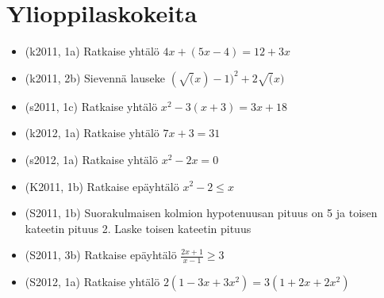 \chapter{Ylioppilaskokeita}

\begin{itemize}
  \item[] (k2011, 1a) Ratkaise yhtälö $4x+(5x-4) = 12+3x$
  \item[] (k2011, 2b) Sievennä lauseke $(\sqrt(x)-1)^2+2\sqrt(x)$
  \item[] (s2011, 1c) Ratkaise yhtälö $x^2-3(x+3) = 3x+18$
  \item[] (k2012, 1a) Ratkaise yhtälö $7x+3 = 31$
  \item[] (s2012, 1a) Ratkaise yhtälö $x^2-2x = 0$

  \item[] (K2011, 1b) Ratkaise epäyhtälö $x^2-2 \leq x$
  \item[] (S2011, 1b) Suorakulmaisen kolmion hypotenuusan pituus on 5
   ja toisen kateetin pituus 2. Laske toisen kateetin pituus
  \item[] (S2011, 3b) Ratkaise epäyhtälö $\frac{2x+1}{x-1} \geq 3$
  \item[] (S2012, 1a) Ratkaise yhtälö $2(1-3x+3x^2) = 3(1+2x+2x^2)$
\end{itemize}




